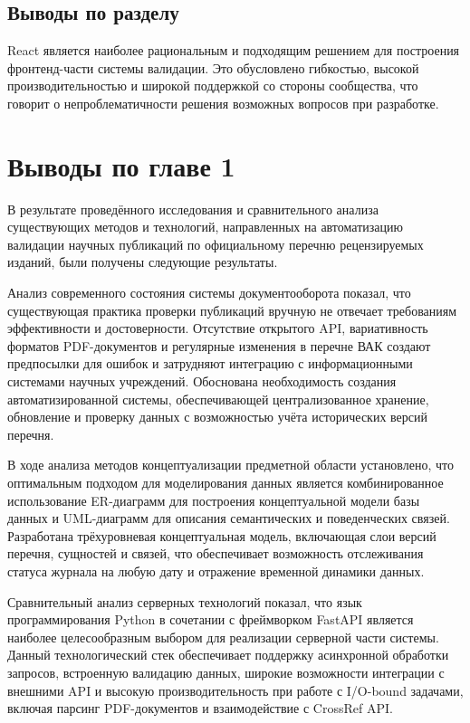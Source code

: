 \subsection{Выводы по разделу}

React является наиболее рациональным и подходящим решением для построения фронтенд-части системы валидации.
Это обусловлено гибкостью, высокой производительностью и широкой поддержкой со стороны сообщества, что говорит
о непроблематичности решения возможных вопросов при разработке.


\section{Выводы по главе 1}
В результате проведённого исследования и сравнительного анализа существующих методов
и технологий, направленных на автоматизацию валидации научных публикаций по
официальному перечню рецензируемых изданий, были получены следующие результаты.

Анализ современного состояния системы документооборота показал, что существующая
практика проверки публикаций вручную не отвечает требованиям эффективности и достоверности.
Отсутствие открытого API, вариативность форматов PDF-документов и регулярные
изменения в перечне ВАК создают предпосылки для ошибок и затрудняют интеграцию с
информационными системами научных учреждений. Обоснована необходимость создания
автоматизированной системы, обеспечивающей централизованное хранение, обновление и
проверку данных с возможностью учёта исторических версий перечня.

В ходе анализа методов концептуализации предметной области установлено, что оптимальным
подходом для моделирования данных является комбинированное использование
ER-диаграмм для построения концептуальной модели базы данных и UML-диаграмм для
описания семантических и поведенческих связей. Разработана трёхуровневая концептуальная
модель, включающая слои версий перечня, сущностей и связей, что обеспечивает возможность 
отслеживания статуса журнала на любую дату и отражение временной динамики данных.

Сравнительный анализ серверных технологий показал, что язык программирования Python
в сочетании с фреймворком FastAPI является наиболее целесообразным выбором для реализации 
серверной части системы. Данный технологический стек обеспечивает поддержку
асинхронной обработки запросов, встроенную валидацию данных, широкие возможности
интеграции с внешними API и высокую производительность при работе с I/O-bound задачами,
включая парсинг PDF-документов и взаимодействие с CrossRef API.

